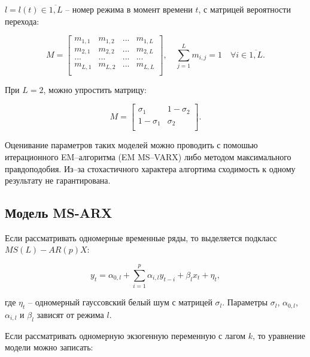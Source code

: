 \documentclass[../report.tex]{subfiles}
\begin{document}
	$l=l(t) \in \overline{1,L}$ – номер режима в момент времени $t$, с матрицей вероятности перехода:
	
	\begin{equation}
	\label{eq:M_matrix}
	M=
	\left[ {\begin{array}{cccc}
		m_{1,1} & m_{1,2} & ... & m_{1,L} \\
		m_{2,1} & m_{2,2} & ... & m_{2,L} \\
		... & ... & ... & ... \\
		m_{L,1} & m_{L,2} & ... & m_{L,L} \\
		\end{array} } \right]
	, \quad
	\sum_{j=1}^{L} m_{i,j} = 1 \quad \forall i \in \overline{1,L}.
	\end{equation}
	
	При $L=2$, можно упростить матрицу:
	
	\begin{equation}
	\label{eq:M_simplified}
	M=
	\left[ {\begin{array}{cc}
		\sigma_{1} & 1-\sigma_{2} \\
		1-\sigma_{1} & \sigma_{2} \\
		\end{array} } \right].
	\end{equation}
	
	Оценивание параметров таких моделей можно проводить с помошью итерационного EM–алгоритма (EM MS–VARX) \cite{malNovopMSVARX} либо методом максимального правдоподобия. Из–за стохастичного характера алгортима сходимость к одному результату не гарантирована.
	
	
	\subsection{Модель MS-ARX}
	
	Если рассматривать одномерные временные ряды, то выделяется подкласс $MS(L)-AR(p)X$:
	
	\begin{equation}  
	y_{t} = \alpha_{0,l} + \sum_{i=1}^{p} \alpha_{i,l} y_{t-i} + \beta_{l} x_{t} + \eta_{t},
	\end{equation}
	
	где $\eta_{t}$ – одномерный гауссовский белый шум с матрицей $\sigma_{l}$. Параметры $\sigma_{l}$, $\alpha_{0,l}$, $\alpha_{i,l}$ и $\beta_{l}$ зависят от режима $l$.
	
	Если рассматривать одномерную экзогенную переменную с лагом $k$, то уравнение модели можно записать:
	
\end{document}
